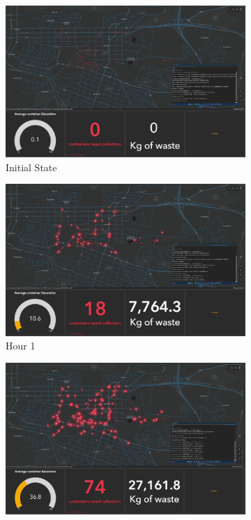 \documentclass[authoryear,preprint,review,doubleblind, 12pt]{elsarticle}
\begin{document}
    \begin{figure}[h!]
        \centering
        \begin{subfigure}[b]{0.45\linewidth}
        \includegraphics[width=\linewidth]{Figures/Sim1.png} 
        \caption{Initial State}
    \end{subfigure}
    \begin{subfigure}[b]{0.45\linewidth}
        \includegraphics[width=\linewidth]{Figures/Sim2.png}
        \caption{Hour 1}
    \end{subfigure}
    \begin{subfigure}[b]{0.45\linewidth}
        \includegraphics[width=\linewidth]{Figures/Sim3.png}

\end{subfigure}
\end{figure}
\end{document}
